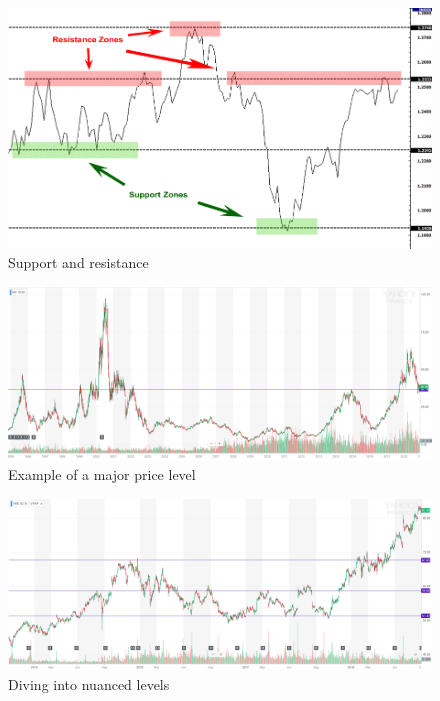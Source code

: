 \documentclass{article}
\begin{document}
\vspace{10pt}

\begin{figure}[!htb]
    \centering
    \includegraphics[width=\textwidth]{imgs/37.png}
    \caption{Support and resistance}
\end{figure}

\vspace{10pt}

\begin{figure}[!htb]
    \centering
    \includegraphics[width=\textwidth]{imgs/38.png}
    \caption{Example of a major price level}
\end{figure}

\vspace{10pt}

\begin{figure}[!htb]
    \centering
    \includegraphics[width=\textwidth]{imgs/39.png}
    \caption{Diving into nuanced levels}
\end{figure}
\end{document}
